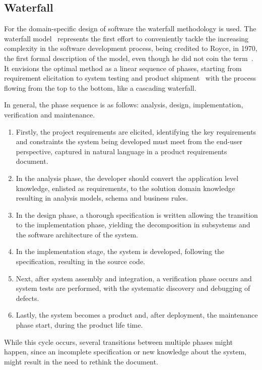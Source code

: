 \subsection{Waterfall}%
\label{subsec:waterfall}
For the domain-specific design of software the waterfall methodology is used.
The waterfall model
~represents the first effort to
conveniently tackle the increasing complexity in the software development
process, being credited to Royce, in 1970, the first formal description of the
model, even though he did not coin the term~\cite{sommerville1996software}. It
envisions the optimal method
as a linear sequence of phases, starting from requirement elicitation to system
testing and product shipment~\cite{cusumano1995beyond} with the process flowing
from the top to the bottom, like a cascading waterfall.

In general, the phase sequence is as follows: analysis, design, implementation,
verification and maintenance.
\begin{enumerate}
  \item Firstly, the project requirements are elicited, identifying the key
    requirements and constraints the system being developed must meet from the
    end-user perspective, captured in natural language in a product requirements document.
  \item In the analysis phase, the developer should convert the application
    level knowledge, enlisted as requirements, to the solution domain knowledge
    resulting in analysis models, schema and business rules.
  \item In the design phase, a thorough specification is written allowing the
    transition to the implementation phase, yielding the decomposition in
    subsystems and the software architecture of the system. 
  \item In the implementation stage, the system is developed, following the
    specification, resulting in the source code.
  \item Next, after system assembly and integration, a verification phase occurs
    and system tests are performed, with the systematic discovery and debugging
    of defects.
  \item Lastly, the system becomes a product and, after deployment, the
    maintenance phase start, during the product life time.
\end{enumerate}
While this cycle occurs, several transitions between multiple phases might
happen, since an incomplete specification or new knowledge about the system,
might result in the need to rethink the document.

